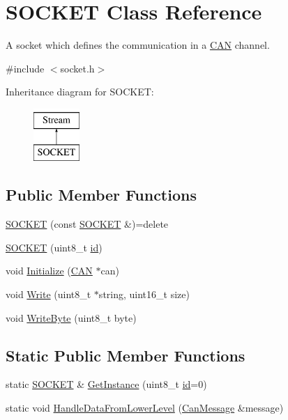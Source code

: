 \hypertarget{class_s_o_c_k_e_t}{}\section{S\+O\+C\+K\+ET Class Reference}
\label{class_s_o_c_k_e_t}


A socket which defines the communication in a \hyperlink{class_c_a_n}{C\+AN} channel.  




{\ttfamily \#include $<$socket.\+h$>$}

Inheritance diagram for S\+O\+C\+K\+ET\+:\begin{figure}[H]
\begin{center}
\leavevmode
\includegraphics[height=2.000000cm]{class_s_o_c_k_e_t}
\end{center}
\end{figure}
\subsection*{Public Member Functions}
\begin{DoxyCompactItemize}
\item 
\hyperlink{class_s_o_c_k_e_t_a354625580716401ca8444fd01b99e89e}{S\+O\+C\+K\+ET} (const \hyperlink{class_s_o_c_k_e_t}{S\+O\+C\+K\+ET} \&)=delete
\item 
\hyperlink{class_s_o_c_k_e_t_ab87e109918e43ba097c153114f4f6494}{S\+O\+C\+K\+ET} (uint8\+\_\+t \hyperlink{class_s_o_c_k_e_t_a0755fe74751c2d94d3d1679cad9e6544}{id})
\item 
void \hyperlink{class_s_o_c_k_e_t_a69219c6c89e78afcd46df2e0af34a341}{Initialize} (\hyperlink{class_c_a_n}{C\+AN} $\ast$can)
\item 
void \hyperlink{class_s_o_c_k_e_t_ad8ee6b81c9f30267406412a95264abed}{Write} (uint8\+\_\+t $\ast$string, uint16\+\_\+t size)
\item 
void \hyperlink{class_s_o_c_k_e_t_abcddb460b7adf3595a813f08f3659356}{Write\+Byte} (uint8\+\_\+t byte)
\end{DoxyCompactItemize}
\subsection*{Static Public Member Functions}
\begin{DoxyCompactItemize}
\item 
static \hyperlink{class_s_o_c_k_e_t}{S\+O\+C\+K\+ET} \& \hyperlink{class_s_o_c_k_e_t_acd81e49443c51d84f7bfe5d616d1b750}{Get\+Instance} (uint8\+\_\+t \hyperlink{class_s_o_c_k_e_t_a0755fe74751c2d94d3d1679cad9e6544}{id}=0)
\item 
static void \hyperlink{class_s_o_c_k_e_t_a7c3771b6f958ea3566fab32ea094d0ff}{Handle\+Data\+From\+Lower\+Level} (\hyperlink{struct_can_message}{Can\+Message} \&message)
\end{DoxyCompactItemize}

